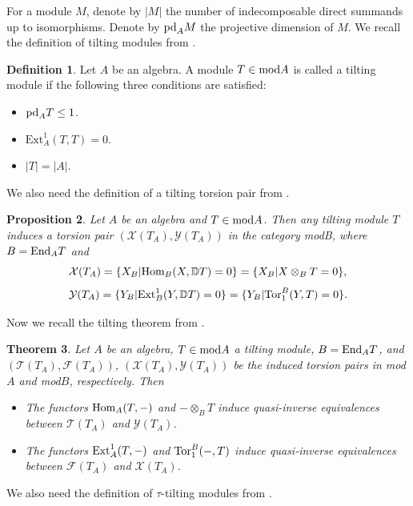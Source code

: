 \documentclass[a4paper]{amsart}
\newtheorem{thm}{Theorem}[section]
\newtheorem{prop}[thm]{Proposition}
\theoremstyle{definition}
\newtheorem{defn}[thm]{Definition}
\theoremstyle{remark}
\numberwithin{equation}{section}
\begin{document}
For a module $M$, denote by $|M|$ the number of indecomposable direct summands up to isomorphisms. Denote by ${\rm pd}_A M$ the projective dimension of $M$. We recall the definition of tilting modules from \cite{HR}.

\begin{defn}\label{2.2} Let $A$ be an algebra. A module $T\in{\rm mod} A$ is called a tilting module if the following three conditions are satisfied:
\begin{itemize}
  \item[(1)]${\rm pd}_A T\leq1$.
 \item[(2)] $ \text{Ext}^1_A(T,T)=0$.
 \item[(3)] $|T|=|A|$.
\end{itemize}
\end{defn}

We also need the definition of a tilting torsion pair from \cite{ASS}.

\begin{prop}\label{2.3}
Let $A$ be an algebra and $T\in\textup{mod}A$. Then any tilting module $T$ induces a torsion pair $(\mathcal{X}(T_A), \mathcal{Y}(T_A))$ in the category \textup{mod}B, where $B = \textup{End}_A T$ and
$$\mathcal{X}(T_A)=\{X_B|\textup{Hom}_B(X,\mathbb{D}T)=0\}=\{X_B|X \otimes_B T=0\},$$
$$\mathcal{Y}(T_A)=\{Y_B|\textup{Ext}_B^1(Y,\mathbb{D}T)=0\}=\{Y_B|\textup{Tor}_1^B(Y,T)=0\}.$$
\end{prop}

Now we recall the tilting theorem from \cite{ASS} .
\begin{thm}\label{2.4}
Let $A$ be an algebra, $T\in \textup{mod}A$ a tilting module, $B =\textup{End}_A T$, and $(\mathcal{T}(T_A), \mathcal{F}(T_A))$, $(\mathcal{X}(T_A), \mathcal{Y}(T_A))$ be the induced torsion pairs in \textup{mod}$A$ and \textup{mod}$B$, respectively. Then
\begin{itemize}
\item [(1)]  The functors $\textup{Hom}_A(T,-)$ and $-\otimes_B T$ induce quasi-inverse equivalences between $\mathcal{T}(T_A)$ and $\mathcal{Y}(T_A)$.
 \item [(2)] The functors $\textup{Ext}^1_A(T,-)$ and $\textup{Tor}^B_1(-,T)$ induce quasi-inverse equivalences between $\mathcal{F}(T_A)$ and $\mathcal{X}(T_A)$.
\end{itemize}
\end{thm}

We also need the definition of $\tau$-tilting modules from \cite{AIR}.
\end{document}

